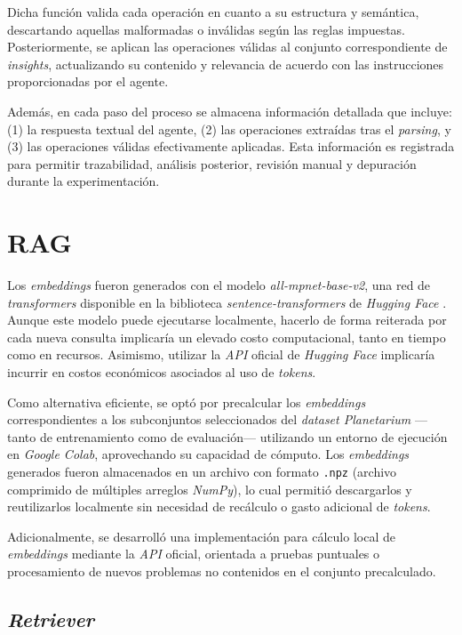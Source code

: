 Dicha función valida cada operación en cuanto a su estructura y semántica, descartando aquellas malformadas o inválidas según las reglas impuestas. Posteriormente, se aplican las operaciones válidas al conjunto correspondiente de \textit{insights}, actualizando su contenido y relevancia de acuerdo con las instrucciones proporcionadas por el agente.

Además, en cada paso del proceso se almacena información detallada que incluye: (1) la respuesta textual del agente, (2) las operaciones extraídas tras el \textit{parsing}, y (3) las operaciones válidas efectivamente aplicadas. Esta información es registrada para permitir trazabilidad, análisis posterior, revisión manual y depuración durante la experimentación.

\section{RAG}

Los \textit{embeddings} fueron generados con el modelo \textit{all-mpnet-base-v2}, una red de \textit{transformers} disponible en la biblioteca \textit{sentence-transformers} de \textit{Hugging Face} \parencite{sentence_transformers_allmpnet}. Aunque este modelo puede ejecutarse localmente, hacerlo de forma reiterada por cada nueva consulta implicaría un elevado costo computacional, tanto en tiempo como en recursos. Asimismo, utilizar la \textit{API} oficial de \textit{Hugging Face} implicaría incurrir en costos económicos asociados al uso de \textit{tokens}.

Como alternativa eficiente, se optó por precalcular los \textit{embeddings} correspondientes a los subconjuntos seleccionados del \textit{dataset Planetarium} —tanto de entrenamiento como de evaluación— utilizando un entorno de ejecución en \textit{Google Colab}, aprovechando su capacidad de cómputo. Los \textit{embeddings} generados fueron almacenados en un archivo con formato \texttt{.npz} (archivo comprimido de múltiples arreglos \textit{NumPy}), lo cual permitió descargarlos y reutilizarlos localmente sin necesidad de recálculo o gasto adicional de \textit{tokens}.

Adicionalmente, se desarrolló una implementación para cálculo local de \textit{embeddings} mediante la \textit{API} oficial, orientada a pruebas puntuales o procesamiento de nuevos problemas no contenidos en el conjunto precalculado.

\subsection{\textit{Retriever}}

